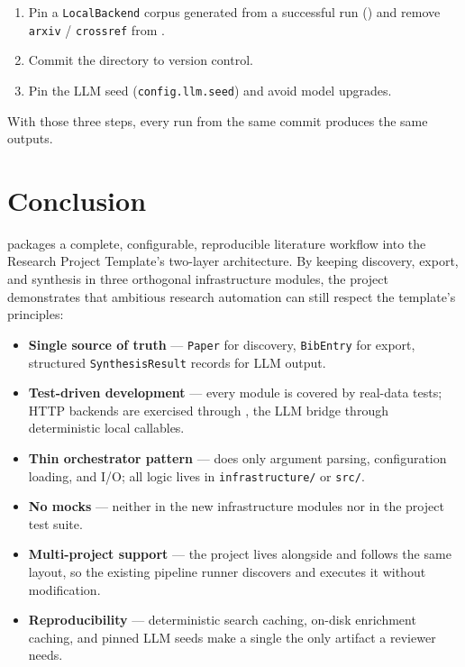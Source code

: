 \documentclass[
  english,
]{article}
\providecommand{\tightlist}{%
  \setlength{\itemsep}{0pt}\setlength{\parskip}{0pt}}
\begin{document}
\begin{enumerate}
\def\labelenumi{\arabic{enumi}.}
\tightlist
\item
  Pin a \texttt{LocalBackend} corpus generated from a successful run
  () and remove
  \texttt{arxiv} / \texttt{crossref} from
  .
\item
  Commit the  directory to version control.
\item
  Pin the LLM seed (\texttt{config.llm.seed}) and avoid model upgrades.
\end{enumerate}

With those three steps, every run from the same commit produces the same
outputs.

\newpage

\section{Conclusion}\label{sec:conclusion}

 packages a complete, configurable,
reproducible literature workflow into the Research Project Template's
two-layer architecture. By keeping discovery, export, and synthesis in
three orthogonal infrastructure modules, the project demonstrates that
ambitious research automation can still respect the template's
principles:

\begin{itemize}
\tightlist
\item
  \textbf{Single source of truth} --- \texttt{Paper} for discovery,
  \texttt{BibEntry} for export, structured \texttt{SynthesisResult}
  records for LLM output.
\item
  \textbf{Test-driven development} --- every module is covered by
  real-data tests; HTTP backends are exercised through
  , the LLM bridge through deterministic local
  callables.
\item
  \textbf{Thin orchestrator pattern} ---
   does only argument parsing,
  configuration loading, and I/O; all logic lives in
  \texttt{infrastructure/} or \texttt{src/}.
\item
  \textbf{No mocks} --- neither in the new infrastructure modules nor in
  the project test suite.
\item
  \textbf{Multi-project support} --- the project lives alongside
   and follows the same layout, so the
  existing pipeline runner discovers and executes it without
  modification.
\item
  \textbf{Reproducibility} --- deterministic search caching, on-disk
  enrichment caching, and pinned LLM seeds make a single
   the only artifact a reviewer needs.
\end{itemize}
\end{document}
